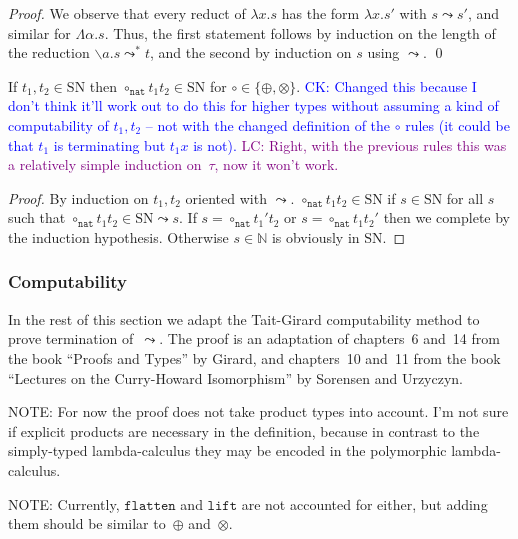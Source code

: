 \documentclass[runningheads,a4paper]{llncs}
\newcommand{\abs}[2]{\lambda #1.#2}
\newcommand{\tabs}[2]{\Lambda #1.#2}
\newcommand{\abstraction}[2]{\backslash #1.#2}
\newcommand{\nat}{\mathtt{nat}}
\newcommand{\flatten}{\mathtt{flatten}}
\newcommand{\lift}{\mathtt{lift}}
\newcommand{\SN}{\mathrm{SN}}
\newcommand{\CK}[1]{\textcolor{blue}{CK: #1}}
\newcommand{\LC}[1]{\textcolor{purple}{LC: #1}}
\begin{document}
\begin{proof}
We observe that every reduct of $\abs{x}{s}$ has the form $\abs{x}{s'}$
with $s \leadsto s'$, and similar for $\tabs{\alpha}{s}$.
Thus, the first statement follows by induction on the length of the
reduction $\abstraction{a}{s} \leadsto^* t$, and the second by induction
on $s$ using $\leadsto$.
\qed
\end{proof}

\begin{lemma}\label{lem_circ_sn_base}
  If $t_1,t_2 \in \SN$ then $\circ_\nat t_1 t_2 \in \SN$ for
  $\circ \in \{\oplus,\otimes\}$.
  \CK{Changed this because I don't think it'll work out to do this for
  higher types without assuming a kind of computability of $t_1,t_2$ --
  not with the changed definition of the $\circ$ rules (it could be
  that $t_1$ is terminating but $t_1 x$ is not).} \LC{Right, with the
  previous rules this was a relatively simple induction on~$\tau$, now
  it won't work.}
\end{lemma}

\begin{proof}
  By induction on $t_1,t_2$ oriented with $\leadsto$.
  $\circ_\nat t_1 t_2 \in \SN$ if $s \in \SN$ for all $s$ such that
  $\circ_\nat t_1 t_2 \in \SN \leadsto s$.  If
  $s = \circ_\nat t_1' t_2$ or $s = \circ_\nat t_1 t_2'$ then we
  complete by the induction hypothesis. Otherwise $s \in \mathbb{N}$
  is obviously in $\SN$.
\end{proof}

\subsubsection{Computability}
In the rest of this section we adapt the Tait-Girard computability
method to prove termination of~$\leadsto$. The proof is an adaptation
of chapters~6 and~14 from the book ``Proofs and Types'' by Girard, and
chapters~10 and~11 from the book ``Lectures on the Curry-Howard
Isomorphism'' by Sorensen and Urzyczyn.

NOTE: For now the proof does not take product types into account. I'm
not sure if explicit products are necessary in the definition, because
in contrast to the simply-typed lambda-calculus they may be encoded in
the polymorphic lambda-calculus.

NOTE: Currently, $\flatten$ and $\lift$ are not accounted for either,
but adding them should be similar to~$\oplus$ and~$\otimes$.
\end{document}
